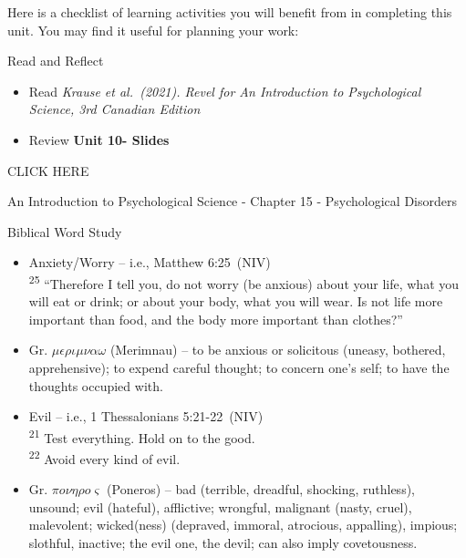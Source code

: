 \documentclass[
]{book}
\providecommand{\tightlist}{%
  \setlength{\itemsep}{0pt}\setlength{\parskip}{0pt}}
\begin{document}
\begin{reflect}
Here is a checklist of learning activities you will benefit from in completing this unit. You may find it useful for planning your work:

{Read and Reflect}

\begin{itemize}
\tightlist
\item
  Read \emph{Krause et al.~(2021). Revel for An Introduction to Psychological Science, 3rd Canadian Edition}\\
\item
  Review \textbf{Unit 10- Slides}
\end{itemize}

CLICK HERE

An Introduction to Psychological Science - Chapter 15 - Psychological Disorders

Biblical Word Study

\begin{itemize}
\item
  Anxiety/Worry -- i.e., Matthew 6:25~(NIV)\\
  \textsuperscript{25} ``Therefore I tell you, do not worry (be anxious) about your life, what you will eat or drink; or about your body, what you will wear. Is not life more important than food, and the body more important than clothes?''\\
\item
  Gr. \(\mu\epsilon\rho\iota\mu\nu\alpha\omega\) (Merimnau) -- to be anxious or solicitous (uneasy, bothered, apprehensive); to expend careful thought; to concern one's self; to have the thoughts occupied with.
\item
  Evil -- i.e., 1 Thessalonians 5:21-22~(NIV)\\
  \textsuperscript{21} Test everything. Hold on to the good.\\
  \textsuperscript{22} Avoid every kind of evil.
\item
  Gr. \(\pi o \nu \eta \rho o \varsigma\) (Poneros) -- bad (terrible, dreadful, shocking, ruthless), unsound; evil (hateful), afflictive; wrongful, malignant (nasty, cruel), malevolent; wicked(ness) (depraved, immoral, atrocious, appalling), impious; slothful, inactive; the evil one, the devil; can also imply covetousness.
\end{itemize}


\end{reflect}
\end{document}
